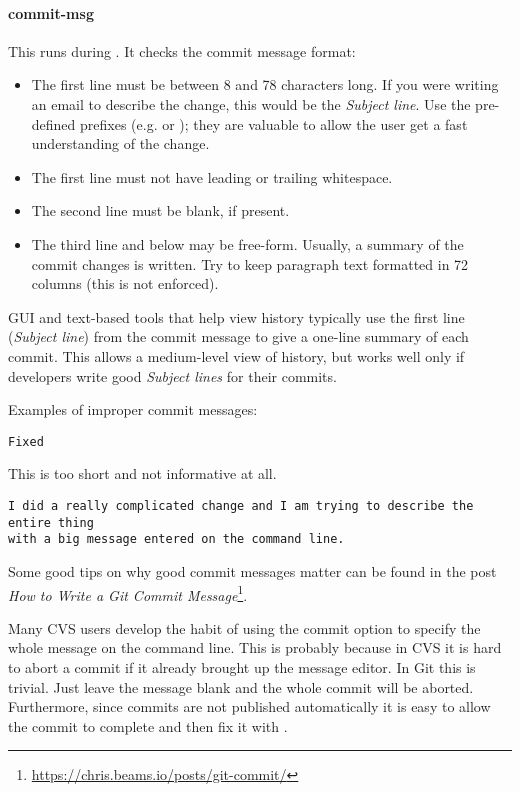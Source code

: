 \paragraph{commit-msg}
\label{par:commit-msg}

This runs during . It checks the commit message format:
\begin{itemize}
\item The first line must be between 8 and 78 characters long. If you were
writing an email to describe the change, this would be the
\textit{Subject line}. Use the pre-defined prefixes (e.g.  or
); they are valuable to allow the user get a fast understanding of
the change.
\item The first line must not have leading or trailing whitespace.
\item The second line must be blank, if present.
\item The third line and below may be free-form. Usually, a summary of the
commit changes is written. Try to keep paragraph text formatted in 72
columns (this is not enforced).
\end{itemize}

GUI and text-based tools that help view history typically use the first line
(\textit{Subject line}) from the commit message to give a one-line summary of
each commit. This allows a medium-level view of history, but works well only if
developers write good \textit{Subject lines} for their commits.

Examples of improper commit messages:

\begin{verbatim}
Fixed
\end{verbatim}

This is too short and not informative at all.

\begin{verbatim}
I did a really complicated change and I am trying to describe the entire thing
with a big message entered on the command line.
\end{verbatim}

Some good tips on why good commit messages matter can be found in the post
\textit{How to Write a Git Commit Message}\footnote{\url{https://chris.beams.io/posts/git-commit/}}.

Many CVS users develop the habit of using the  commit option to specify
the whole message on the command line. This is probably because in CVS it is
hard to abort a commit if it already brought up the message editor. In Git this
is trivial. Just leave the message blank and the whole commit will be aborted.
Furthermore, since commits are not published automatically it is easy to allow
the commit to complete and then fix it with .


